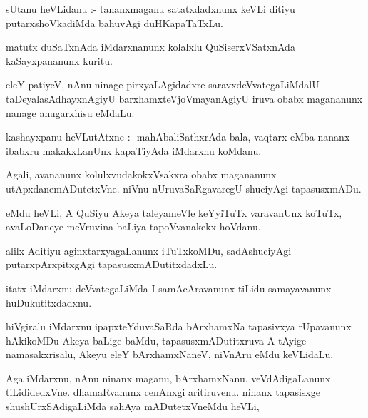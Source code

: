\documentclass{article}
\begin{document}


\begin{mn}
sUtanu heVLidanu :- tananxmaganu satatxdadxnunx keVLi ditiyu putarxshoVkadiMda 
bahuvAgi duHKapaTaTxLu.
\end{mn}

\begin{mn}
matutx duSaTxnAda iMdarxnanunx kolalxlu QuSiserxVSatxnAda kaSayxpananunx kuritu.
\end{mn}

\begin{mn}
eleY patiyeV, nAnu ninage pirxyaLAgidadxre saravxdeVvategaLiMdalU 
taDeyalasAdhayxnAgiyU barxhamxteVjoVmayanAgiyU iruva obabx magananunx 
nanage anugarxhisu eMdaLu.
\end{mn}

\begin{mn}
kashayxpanu heVLutAtxne :- mahAbaliSathxrAda bala, vaqtarx eMba nananx 
ibabxru makakxLanUnx kapaTiyAda iMdarxnu koMdanu.
\end{mn}

\begin{mn}
Agali, avananunx kolulxvudakokxVsakxra  obabx magananunx utApxdanemADutetxVne.  
niVnu  nUruvaSaRgavaregU shuciyAgi tapasusxmADu.
\end{mn}

\begin{mn}
eMdu heVLi, A QuSiyu Akeya taleyameVle keYyiTuTx  varavanUnx koTuTx, avaLoDaneye 
meVruvina baLiya tapoVvanakekx hoVdanu.
\end{mn}

\begin{mn}
alilx Aditiyu  aginxtarxyagaLanunx iTuTxkoMDu, sadAshuciyAgi putarxpArxpitxgAgi 
tapasusxmADutitxdadxLu.
\end{mn}

\begin{mn}
itatx iMdarxnu deVvategaLiMda I samAcAravanunx tiLidu samayavanunx huDukutitxdadxnu.
\end{mn}

\begin{mn}
hiVgiralu iMdarxnu ipapxteYduvaSaRda bArxhamxNa tapasivxya rUpavanunx hAkikoMDu 
Akeya baLige baMdu, tapasusxmADutitxruva A tAyige namasakxrisalu, Akeyu  
eleY bArxhamxNaneV,  niVnAru eMdu keVLidaLu.
\end{mn}

\begin{mn}
Aga iMdarxnu, nAnu ninanx maganu, bArxhamxNanu. veVdAdigaLanunx tiLididedxVne.  
dhamaRvanunx cenAnxgi aritiruvenu. ninanx tapasisxge shushUrxSAdigaLiMda 
sahAya mADutetxVneMdu heVLi,
\end{mn}
\end{document}
